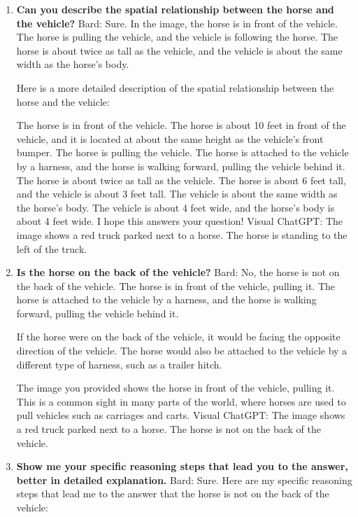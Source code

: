     \begin{enumerate}
        \item \textbf{Can you describe the spatial relationship between the horse and the vehicle?}
        \subitem Bard:
        Sure. In the image, the horse is in front of the vehicle. The horse is pulling the vehicle, and the vehicle is following the horse. The horse is about twice as tall as the vehicle, and the vehicle is about the same width as the horse's body.

        Here is a more detailed description of the spatial relationship between the horse and the vehicle:

        The horse is in front of the vehicle. The horse is about 10 feet in front of the vehicle, and it is located at about the same height as the vehicle's front bumper.
        The horse is pulling the vehicle. The horse is attached to the vehicle by a harness, and the horse is walking forward, pulling the vehicle behind it.
        The horse is about twice as tall as the vehicle. The horse is about 6 feet tall, and the vehicle is about 3 feet tall.
        The vehicle is about the same width as the horse's body. The vehicle is about 4 feet wide, and the horse's body is about 4 feet wide.
        I hope this answers your question!
        \subitem Visual ChatGPT: The image shows a red truck parked next to a horse. The horse is standing to the left of the truck.
        \item \textbf{Is the horse on the back of the vehicle?}
        \subitem Bard: 
        No, the horse is not on the back of the vehicle. The horse is in front of the vehicle, pulling it. The horse is attached to the vehicle by a harness, and the horse is walking forward, pulling the vehicle behind it.
        
        If the horse were on the back of the vehicle, it would be facing the opposite direction of the vehicle. The horse would also be attached to the vehicle by a different type of harness, such as a trailer hitch.
        
        The image you provided shows the horse in front of the vehicle, pulling it. This is a common sight in many parts of the world, where horses are used to pull vehicles such as carriages and carts.
        \subitem Visual ChatGPT: The image shows a red truck parked next to a horse. The horse is not on the back of the vehicle.
        \item \textbf{Show me your specific reasoning steps that lead you to the answer, better in detailed explanation.}
        \subitem Bard:
        Sure. Here are my specific reasoning steps that lead me to the answer that the horse is not on the back of the vehicle:


\end{enumerate}
